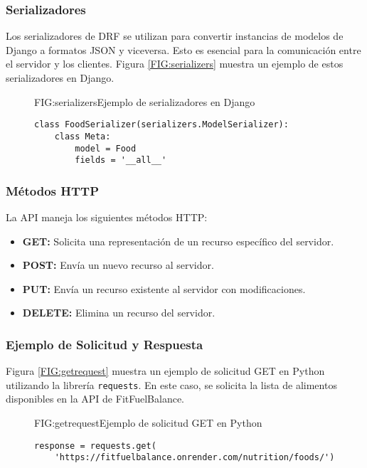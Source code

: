 \subsubsection{Serializadores}
Los serializadores de DRF se utilizan para convertir instancias de modelos de Django a formatos JSON y viceversa. Esto es esencial para la comunicación entre el servidor y los clientes. Figura \ref{FIG:serializers} muestra un ejemplo de estos serializadores en Django.

\begin{figure}[Ejemplo Código Serializadores]{FIG:serializers}{Ejemplo de serializadores en Django}
\begin{verbatim}
class FoodSerializer(serializers.ModelSerializer):
    class Meta:
        model = Food
        fields = '__all__'
\end{verbatim}
\end{figure}

\newpage
\subsubsection{Métodos HTTP}
La API maneja los siguientes métodos HTTP:
\begin{itemize}
    \item \textbf{GET:} Solicita una representación de un recurso específico del servidor.
    \item \textbf{POST:} Envía un nuevo recurso al servidor.
    \item \textbf{PUT:} Envía un recurso existente al servidor con modificaciones.
    \item \textbf{DELETE:} Elimina un recurso del servidor.
\end{itemize}

\subsubsection{Ejemplo de Solicitud y Respuesta}
Figura \ref{FIG:getrequest} muestra un ejemplo de solicitud GET en Python utilizando la librería \texttt{requests}. En este caso, se solicita la lista de alimentos disponibles en la API de FitFuelBalance.
\begin{figure}[Ejemplo Solicitud GET]{FIG:getrequest}{Ejemplo de solicitud GET en Python}
\begin{verbatim}
response = requests.get(
    'https://fitfuelbalance.onrender.com/nutrition/foods/')
\end{verbatim}
\end{figure}

